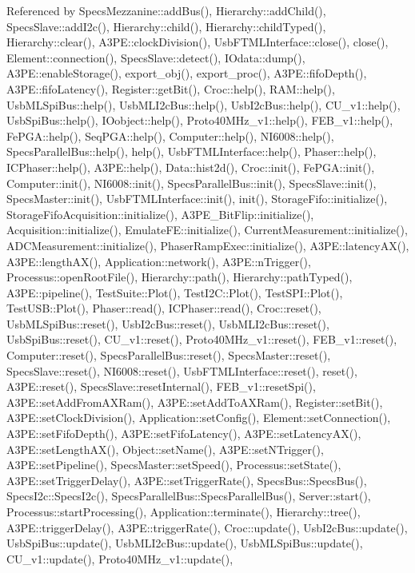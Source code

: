 Referenced by Specs\+Mezzanine\+::add\+Bus(), Hierarchy\+::add\+Child(), Specs\+Slave\+::add\+I2c(), Hierarchy\+::child(), Hierarchy\+::child\+Typed(), Hierarchy\+::clear(), A3\+P\+E\+::clock\+Division(), Usb\+F\+T\+M\+L\+Interface\+::close(), close(), Element\+::connection(), Specs\+Slave\+::detect(), I\+Odata\+::dump(), A3\+P\+E\+::enable\+Storage(), export\+\_\+obj(), export\+\_\+proc(), A3\+P\+E\+::fifo\+Depth(), A3\+P\+E\+::fifo\+Latency(), Register\+::get\+Bit(), Croc\+::help(), R\+A\+M\+::help(), Usb\+M\+L\+Spi\+Bus\+::help(), Usb\+M\+L\+I2c\+Bus\+::help(), Usb\+I2c\+Bus\+::help(), C\+U\+\_\+v1\+::help(), Usb\+Spi\+Bus\+::help(), I\+Oobject\+::help(), Proto40\+M\+Hz\+\_\+v1\+::help(), F\+E\+B\+\_\+v1\+::help(), Fe\+P\+G\+A\+::help(), Seq\+P\+G\+A\+::help(), Computer\+::help(), N\+I6008\+::help(), Specs\+Parallel\+Bus\+::help(), help(), Usb\+F\+T\+M\+L\+Interface\+::help(), Phaser\+::help(), I\+C\+Phaser\+::help(), A3\+P\+E\+::help(), Data\+::hist2d(), Croc\+::init(), Fe\+P\+G\+A\+::init(), Computer\+::init(), N\+I6008\+::init(), Specs\+Parallel\+Bus\+::init(), Specs\+Slave\+::init(), Specs\+Master\+::init(), Usb\+F\+T\+M\+L\+Interface\+::init(), init(), Storage\+Fifo\+::initialize(), Storage\+Fifo\+Acquisition\+::initialize(), A3\+P\+E\+\_\+\+Bit\+Flip\+::initialize(), Acquisition\+::initialize(), Emulate\+F\+E\+::initialize(), Current\+Measurement\+::initialize(), A\+D\+C\+Measurement\+::initialize(), Phaser\+Ramp\+Exec\+::initialize(), A3\+P\+E\+::latency\+A\+X(), A3\+P\+E\+::length\+A\+X(), Application\+::network(), A3\+P\+E\+::n\+Trigger(), Processus\+::open\+Root\+File(), Hierarchy\+::path(), Hierarchy\+::path\+Typed(), A3\+P\+E\+::pipeline(), Test\+Suite\+::\+Plot(), Test\+I2\+C\+::\+Plot(), Test\+S\+P\+I\+::\+Plot(), Test\+U\+S\+B\+::\+Plot(), Phaser\+::read(), I\+C\+Phaser\+::read(), Croc\+::reset(), Usb\+M\+L\+Spi\+Bus\+::reset(), Usb\+I2c\+Bus\+::reset(), Usb\+M\+L\+I2c\+Bus\+::reset(), Usb\+Spi\+Bus\+::reset(), C\+U\+\_\+v1\+::reset(), Proto40\+M\+Hz\+\_\+v1\+::reset(), F\+E\+B\+\_\+v1\+::reset(), Computer\+::reset(), Specs\+Parallel\+Bus\+::reset(), Specs\+Master\+::reset(), Specs\+Slave\+::reset(), N\+I6008\+::reset(), Usb\+F\+T\+M\+L\+Interface\+::reset(), reset(), A3\+P\+E\+::reset(), Specs\+Slave\+::reset\+Internal(), F\+E\+B\+\_\+v1\+::reset\+Spi(), A3\+P\+E\+::set\+Add\+From\+A\+X\+Ram(), A3\+P\+E\+::set\+Add\+To\+A\+X\+Ram(), Register\+::set\+Bit(), A3\+P\+E\+::set\+Clock\+Division(), Application\+::set\+Config(), Element\+::set\+Connection(), A3\+P\+E\+::set\+Fifo\+Depth(), A3\+P\+E\+::set\+Fifo\+Latency(), A3\+P\+E\+::set\+Latency\+A\+X(), A3\+P\+E\+::set\+Length\+A\+X(), Object\+::set\+Name(), A3\+P\+E\+::set\+N\+Trigger(), A3\+P\+E\+::set\+Pipeline(), Specs\+Master\+::set\+Speed(), Processus\+::set\+State(), A3\+P\+E\+::set\+Trigger\+Delay(), A3\+P\+E\+::set\+Trigger\+Rate(), Specs\+Bus\+::\+Specs\+Bus(), Specs\+I2c\+::\+Specs\+I2c(), Specs\+Parallel\+Bus\+::\+Specs\+Parallel\+Bus(), Server\+::start(), Processus\+::start\+Processing(), Application\+::terminate(), Hierarchy\+::tree(), A3\+P\+E\+::trigger\+Delay(), A3\+P\+E\+::trigger\+Rate(), Croc\+::update(), Usb\+I2c\+Bus\+::update(), Usb\+Spi\+Bus\+::update(), Usb\+M\+L\+I2c\+Bus\+::update(), Usb\+M\+L\+Spi\+Bus\+::update(), C\+U\+\_\+v1\+::update(), Proto40\+M\+Hz\+\_\+v1\+::update(), 